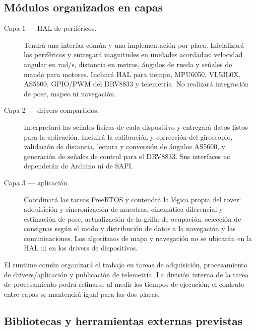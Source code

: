 \subsection{Módulos organizados en capas}

\begin{description}
  \item[Capa 1 --- HAL de periféricos.] Tendrá una interfaz común y una
        implementación por placa. Inicializará los periféricos y entregará
        magnitudes en unidades acordadas: velocidad angular en rad/s,
        distancia en metros, ángulos de rueda y señales de mando para motores.
        Incluirá HAL para tiempo, MPU6050, VL53L0X, AS5600, GPIO/PWM del DRV8833
        y telemetría. No realizará integración de pose, mapeo ni navegación.
  \item[Capa 2 --- drivers compartidos.] Interpretará las señales físicas de
        cada dispositivo y entregará datos listos para la aplicación. Incluirá
        la calibración y corrección del giroscopio, validación de distancia,
        lectura y conversión de ángulos AS5600, y generación de señales de
        control para el DRV8833. Sus interfaces no dependerán de Arduino ni de
        SAPI.
  \item[Capa 3 --- aplicación.] Coordinará las tareas FreeRTOS y contendrá la
        lógica propia del rover: adquisición y sincronización de muestras,
        cinemática diferencial y estimación de pose, actualización de la grilla
        de ocupación, selección de consignas según el modo y distribución de
        datos a la navegación y las comunicaciones. Los algoritmos de mapa y
        navegación no se ubicarán en la HAL ni en los drivers de dispositivos.
\end{description}

El runtime común organizará el trabajo en tareas de adquisición, procesamiento
de drivers/aplicación y publicación de telemetría. La división interna de la
tarea de procesamiento podrá refinarse al medir los tiempos de ejecución; el
contrato entre capas se mantendrá igual para las dos placas.

\subsection{Bibliotecas y herramientas externas previstas}

